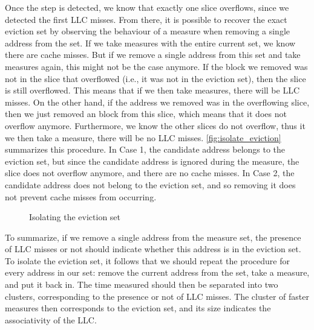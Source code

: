 \documentclass[a4paper,11pt,oneside]{report}
\begin{document}
Once the step is detected, we know that exactly one slice overflows, since we detected the first LLC misses. From there, it is possible to recover the exact eviction set by observing the behaviour of a measure when removing a single address from the set. If we take measures with the entire current set, we know there are cache misses. But if we remove a single address from this set and take measures again, this might not be the case anymore. If the block we removed was not in the slice that overflowed (i.e., it was not in the eviction set), then the slice is still overflowed. This means that if we then take measures, there will be LLC misses. On the other hand, if the address we removed was in the overflowing slice, then we just removed an block from this slice, which means that it does not overflow anymore. Furthermore, we know the other slices do not overflow, thus it we then take a measure, there will be no LLC misses. \autoref{fig:isolate_eviction} summarizes this procedure. In Case 1, the candidate address belongs to the eviction set, but since the candidate address is ignored during the measure, the slice does not overflow anymore, and there are no cache misses. In Case 2, the candidate address does not belong to the eviction set, and so removing it does not prevent cache misses from occurring.

\begin{figure}
    \centering
    \caption{Isolating the eviction set}
    \label{fig:isolate_eviction}
\end{figure}

To summarize, if we remove a single address from the measure set, the presence of LLC misses or not should indicate whether this address is in the eviction set. To isolate the eviction set, it follows that we should repeat the procedure for every address in our set: remove the current address from the set, take a measure, and put it back in. The time measured should then be separated into two clusters, corresponding to the presence or not of LLC misses. The cluster of faster measures then corresponds to the eviction set, and its size indicates the associativity of the LLC.
\end{document}
